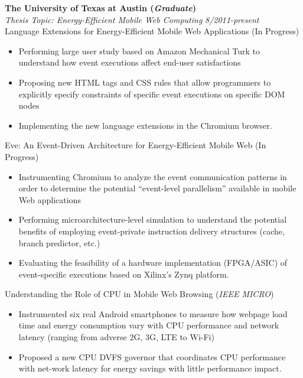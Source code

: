 \documentclass[margin, 9pt]{res} %
\begin{document}
\begin{resume}
{\large\textbf{The University of Texas at Austin (\textit{Graduate})}}\\

\vspace*{-7pt}
{\large\textit{Thesis Topic: Energy-Efficient Mobile Web Computing}} \hfill\textit{8/2011-present}\\

\vspace*{-7pt}
Language Extensions for Energy-Efficient Mobile Web Applications \hfill(In Progress)\\
\vspace*{-10pt}
\begin{itemize}[leftmargin=*] \itemsep -3pt
\vspace*{-5pt}
	\item Performing large user study based on Amazon Mechanical Turk to understand how event executions affect end-user satisfactions
	\item Proposing new HTML tags and CSS rules that allow programmers to explicitly specify constraints of specific event executions on specific DOM nodes
	\item Implementing the new language extensions in the Chromium browser.
\end{itemize}

\medskip
Eve: An Event-Driven Architecture for Energy-Efficient Mobile Web \hfill(In Progress)\\
\vspace*{-10pt}
\begin{itemize}[leftmargin=*] \itemsep -3pt
\vspace*{-5pt}
	\item Instrumenting Chromium to analyze the event communication patterns in order to determine the potential ``event-level parallelism'' available in mobile Web applications
	\item Performing microarchitecture-level simulation to understand the potential benefits of employing event-private instruction delivery structures (cache, branch predictor, etc.)
	\item Evaluating the feasibility of a hardware implementation (FPGA/ASIC) of event-specific executions based on Xilinx's Zynq platform.
\end{itemize}

\medskip
Understanding the Role of CPU in Mobile Web Browsing \hfill(\textit{IEEE MICRO})\\
\vspace*{-10pt}
\begin{itemize}[leftmargin=*] \itemsep -3pt
\vspace*{-5pt}
	\item Instrumented six real Android smartphones to measure how webpage load time and energy consumption vary with CPU performance and network latency (ranging from adverse 2G, 3G, LTE to Wi-Fi)
	\item Proposed a new CPU DVFS governor that coordinates CPU performance with net-work latency for energy savings with little performance impact.
\end{itemize}


\end{resume}
\end{document}
